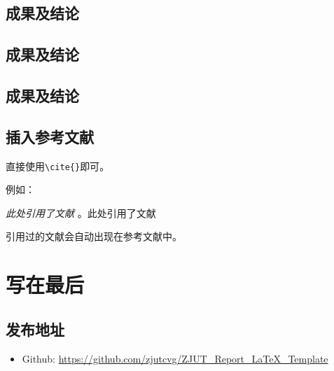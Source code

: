 \documentclass[12pt,hyperref,a4paper,UTF8]{ctexart}
\begin{document}
\subsection{成果及结论}


\subsection{成果及结论}


\subsection{成果及结论}





%
%
%
%
%
%



\subsection{插入参考文献}
直接使用\verb|\cite{}|即可\cite{}。

例如：\cite{}


   \textit{ 此处引用了文献}
   \cite{DBLP:conf/nips/VaswaniSPUJGKP17}。此处引用了文献\cite{DBLP:conf/nips/VaswaniSPUJGKP17}


引用过的文献会自动出现在参考文献中。

\section{写在最后}
\subsection{发布地址}
\begin{itemize}
    \item Github: \url{https://github.com/zjutcvg/ZJUT_Report_LaTeX_Template}
\end{itemize}
\end{document}
